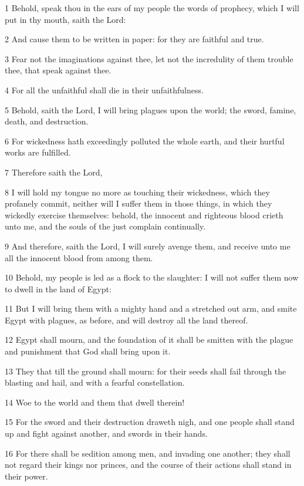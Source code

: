 \par 1 Behold, speak thou in the ears of my people the words of prophecy, which I will put in thy mouth, saith the Lord:
\par 2 And cause them to be written in paper: for they are faithful and true.
\par 3 Fear not the imaginations against thee, let not the incredulity of them trouble thee, that speak against thee.
\par 4 For all the unfaithful shall die in their unfaithfulness.
\par 5 Behold, saith the Lord, I will bring plagues upon the world; the sword, famine, death, and destruction.
\par 6 For wickedness hath exceedingly polluted the whole earth, and their hurtful works are fulfilled.
\par 7 Therefore saith the Lord,
\par 8 I will hold my tongue no more as touching their wickedness, which they profanely commit, neither will I suffer them in those things, in which they wickedly exercise themselves: behold, the innocent and righteous blood crieth unto me, and the souls of the just complain continually.
\par 9 And therefore, saith the Lord, I will surely avenge them, and receive unto me all the innocent blood from among them.
\par 10 Behold, my people is led as a flock to the slaughter: I will not suffer them now to dwell in the land of Egypt:
\par 11 But I will bring them with a mighty hand and a stretched out arm, and smite Egypt with plagues, as before, and will destroy all the land thereof.
\par 12 Egypt shall mourn, and the foundation of it shall be smitten with the plague and punishment that God shall bring upon it.
\par 13 They that till the ground shall mourn: for their seeds shall fail through the blasting and hail, and with a fearful constellation.
\par 14 Woe to the world and them that dwell therein!
\par 15 For the sword and their destruction draweth nigh, and one people shall stand up and fight against another, and swords in their hands.
\par 16 For there shall be sedition among men, and invading one another; they shall not regard their kings nor princes, and the course of their actions shall stand in their power.
